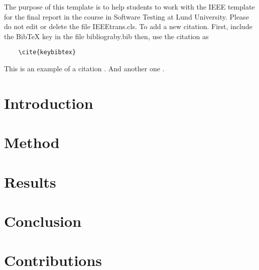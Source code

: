 The purpose of this template is to help students to work with the IEEE template for the final report in the course in Software Testing at Lund University.
Please do not edit or delete the file IEEEtrans.cls. 
To add a new citation. First, include the BibTeX key in the file bibliograby.bib then, use the citation as  \begin{verbatim}
    \cite{keybibtex}
\end{verbatim}
This is an example of a citation \cite{naik2011software}. And another one \cite{garousi2016systematic}.
\section{Introduction}

\section{Method}
\section{Results}
\section{Conclusion}
\section{Contributions}

